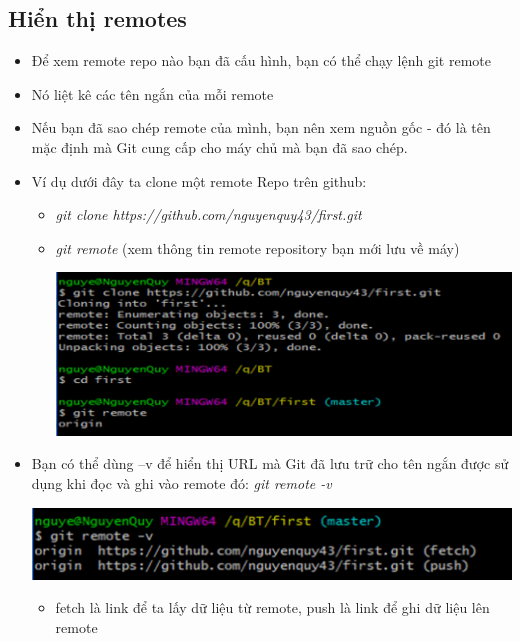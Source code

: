 \documentclass[12pt,a4paper]{report}
\begin{document}
\subsection{Hiển thị remotes} 
\begin{itemize}
\item Để xem remote repo nào bạn đã cấu hình, bạn có thể chạy lệnh git remote
\item Nó liệt kê các tên ngắn của mỗi remote
\item Nếu bạn đã sao chép remote của mình, bạn nên xem nguồn gốc - đó là tên mặc định mà Git cung cấp cho máy chủ mà bạn đã sao chép. 
\item Ví dụ dưới đây ta clone một remote Repo trên github:
	\begin{itemize}
		\item \textit{git clone https://github.com/nguyenquy43/first.git}
		\item \textit{git remote} (xem thông tin remote repository bạn mới lưu về máy)

	\includegraphics[width=0.8\linewidth]{screenshot032}
	
	\label{fig:screenshot032}
	\end{itemize}
\item Bạn có thể dùng –v để hiển thị URL mà Git đã lưu trữ cho tên ngắn được sử dụng khi đọc và ghi vào remote đó: {\it git remote -v}

	\includegraphics[width=0.8\linewidth]{screenshot033}
	
	\label{fig:screenshot033}

	\begin{itemize}
\item fetch là link để ta lấy dữ liệu từ remote, push là link để ghi dữ liệu lên remote
\end{itemize}\end{itemize}
\end{document}
